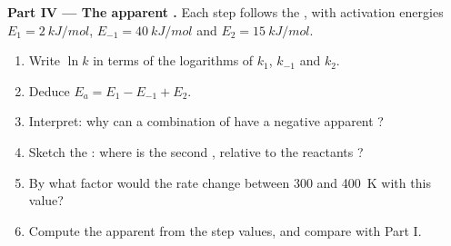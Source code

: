 \begin{problem}
\medskip
\noindent\textbf{Part IV --- The apparent .}
Each step follows the , with activation energies $E_1 =
\qty{2}{kJ/mol}$, $E_{-1} = \qty{40}{kJ/mol}$ and $E_2 =
\qty{15}{kJ/mol}$.
\begin{enumerate}[resume]
  \item Write $\ln k$ in terms of the logarithms of $k_1$, $k_{-1}$ and
        $k_2$.
  \item Deduce $E_a = E_1 - E_{-1} + E_2$.
  \item Interpret: why can a combination of  have a
        negative apparent ?
  \item Sketch the : where is the second ,
        relative to the reactants ?
  \item By what factor would the rate change between 300 and \qty{400}{K}
        with this value?
  \item Compute the apparent  from the step values, and
        compare with Part I.
\end{enumerate}
\end{problem}
